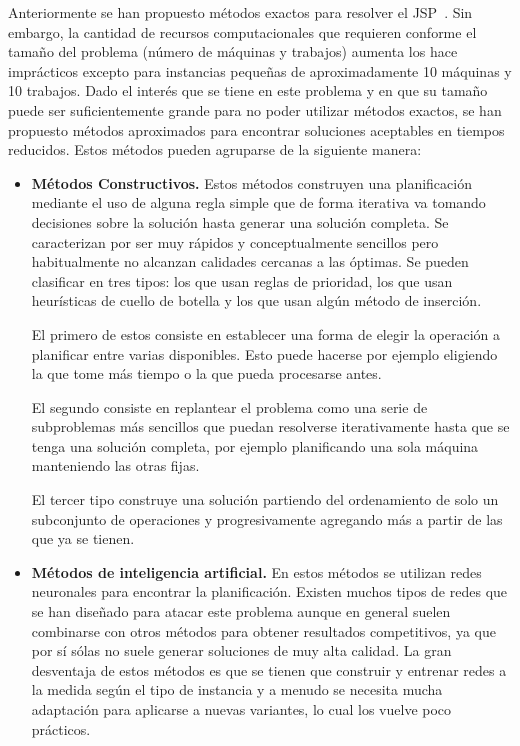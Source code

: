 Anteriormente se han propuesto métodos exactos para resolver el JSP~\cite{Brucker1994}. 
%
Sin embargo, la cantidad de recursos computacionales que requieren conforme el tamaño del problema (número de máquinas y trabajos) aumenta los hace imprácticos excepto 
para instancias pequeñas de aproximadamente 10 máquinas y 10 trabajos.
%
Dado el interés que se tiene en este problema y en que su tamaño puede ser suficientemente grande para no poder utilizar métodos exactos, se han propuesto métodos aproximados 
para encontrar soluciones aceptables en tiempos reducidos. 
%
Estos métodos pueden agruparse de la siguiente manera\cite{jain1998state,Zhang2019}:
\begin{itemize}
\item \textbf{Métodos Constructivos.} Estos métodos construyen una planificación mediante el uso de alguna regla simple que de forma iterativa va tomando decisiones sobre la solución
hasta generar una solución completa. Se caracterizan por ser muy rápidos y conceptualmente sencillos pero habitualmente no alcanzan calidades cercanas a las óptimas.
Se pueden clasificar en tres tipos: los que usan reglas de prioridad, los que usan heurísticas de cuello de botella y los que usan algún método de inserción.

El primero de estos consiste en establecer una forma de elegir la operación a planificar entre varias disponibles. Esto puede hacerse por ejemplo eligiendo la que tome 
más tiempo o la que pueda procesarse antes.

El segundo consiste en replantear el problema como una serie de subproblemas más sencillos que puedan resolverse iterativamente hasta que se tenga una solución completa, 
por ejemplo planificando una sola máquina manteniendo las otras fijas.

El tercer tipo construye una solución partiendo del ordenamiento de solo un subconjunto de operaciones y progresivamente agregando más a partir de las que ya se tienen.

\item \textbf{Métodos de inteligencia artificial.} En estos métodos se utilizan redes neuronales para encontrar la planificación. Existen muchos tipos de redes que se 
han diseñado para atacar este problema aunque en general suelen combinarse con otros métodos para obtener resultados competitivos, ya que por sí sólas no suele generar
soluciones de muy alta calidad. La gran desventaja de estos métodos es que se tienen que construir y entrenar redes a la medida según el tipo de instancia y a menudo 
se necesita mucha adaptación para aplicarse a nuevas variantes, lo cual los vuelve poco prácticos.


\end{itemize}
